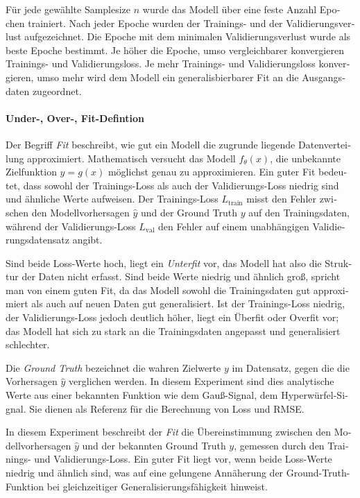 \begin{otherlanguage}{ngerman}
Für jede gewählte Samplesize $n$ wurde das Modell über eine feste Anzahl Epochen trainiert. Nach jeder Epoche wurden der Trainings- und der Validierungsverlust aufgezeichnet. Die Epoche mit dem minimalen Validierungsverlust wurde als beste Epoche bestimmt. Je höher die Epoche, umso vergleichbarer konvergieren Trainings- und Validierungsloss. Je mehr Trainings- und Validierungsloss konvergieren, umso mehr wird dem Modell ein generalisbierbarer Fit an die Ausgangsdaten zugeordnet. 



\paragraph{Under-, Over-, Fit-Defintion} Der Begriff \textit{Fit} beschreibt, wie gut ein Modell die zugrunde liegende Datenverteilung approximiert. Mathematisch versucht das Modell $f_\theta(x)$, die unbekannte Zielfunktion $y = g(x)$ möglichst genau zu approximieren. Ein guter Fit bedeutet, dass sowohl der Trainings-Loss als auch der Validierungs-Loss niedrig sind und ähnliche Werte aufweisen. Der Trainings-Loss $L_{\text{train}}$ misst den Fehler zwischen den Modellvorhersagen $\hat{y}$ und der Ground Truth $y$ auf den Trainingsdaten, während der Validierungs-Loss $L_{\text{val}}$ den Fehler auf einem unabhängigen Validierungsdatensatz angibt. 

Sind beide Loss-Werte hoch, liegt ein \textit{Unterfit} vor, das Modell hat also die Struktur der Daten nicht erfasst. Sind beide Werte niedrig und ähnlich groß, spricht man von einem guten Fit, da das Modell sowohl die Trainingsdaten gut approximiert als auch auf neuen Daten gut generalisiert. Ist der Trainings-Loss niedrig, der Validierungs-Loss jedoch deutlich höher, liegt ein Überfit oder Overfit vor; das Modell hat sich zu stark an die Trainingsdaten angepasst und generalisiert schlechter.

Die \textit{Ground Truth} bezeichnet die wahren Zielwerte $y$ im Datensatz, gegen die die Vorhersagen $\hat{y}$ verglichen werden. In diesem Experiment sind dies analytische Werte aus einer bekannten Funktion wie dem Gauß-Signal, dem Hyperwürfel-Signal. Sie dienen als Referenz für die Berechnung von Loss und RMSE.

In diesem Experiment beschreibt der \textit{Fit} die Übereinstimmung zwischen den Modellvorhersagen $\hat{y}$ und der bekannten Ground Truth $y$, gemessen durch den Trainings- und Validierungs-Loss. Ein guter Fit liegt vor, wenn beide Loss-Werte niedrig und ähnlich sind, was auf eine gelungene Annäherung der Ground-Truth-Funktion bei gleichzeitiger Generalisierungsfähigkeit hinweist.



\end{otherlanguage}
